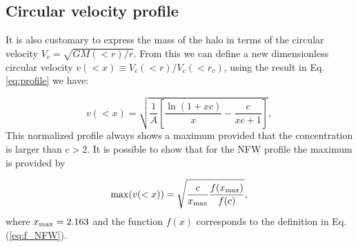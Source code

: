 \documentclass{emulateapj}
\begin{document}
\subsection{Circular velocity profile}

It is also customary to express the mass of the halo in terms of the
circular velocity $V_{c}=\sqrt{GM(<r)/r}$.  From this we can define a
new dimensionless circular velocity $v(<x)\equiv
V_{c}(<r)/V_{c}(<r_v)$, using the result in Eq. \ref{eq:profile} we
have:

\begin{equation}
v(<x)=\sqrt{\frac{1}{A}\left[\frac{\ln\left(1+xc\right)}{x}-\frac{c}{xc+1}\right]},
\end{equation}
%
This normalized profile always shows a maximum provided that the
concentration is larger than $c>2$.  It is possible to show that for
the NFW profile the maximum is provided by

\begin{equation}
\mathrm{max}(v(<x)) = \sqrt{\frac{c}{x_{\rm max}}\frac{f(x_{\rm
      max})}{f(c)}},
\label{eq:max_v}
\end{equation}
where $x_{\rm max}=2.163$ \citep{Klypin2016} and the function $f(x)$
corresponds to the definition in Eq. (\ref{eq:f_NFW}).
\end{document}
